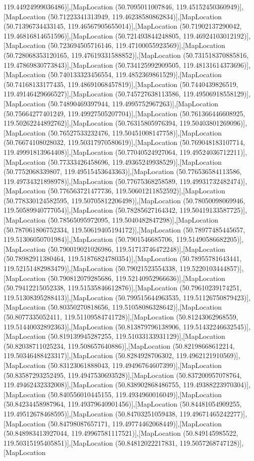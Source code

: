 119.44924999036486)],[MapLocation (50.7095011007846, 119.45152450360949)],[MapLocation (50.71223341313949, 119.46238580862834)],[MapLocation (50.71396734433145, 119.46567905655014)],[MapLocation (50.71902137290042, 119.46816814651596)],[MapLocation (50.721493844248805, 119.46924103012192)],[MapLocation (50.723694505716146, 119.47100055923569)],[MapLocation (50.728068353120165, 119.47619331588852)],[MapLocation (50.731518370885816, 119.47869830773843)],[MapLocation (50.734125992909505, 119.48131614373696)],[MapLocation (50.740133323456554, 119.4852369861529)],[MapLocation (50.74168133177435, 119.48691068457819)],[MapLocation (50.7440439826519, 119.49146429666527)],[MapLocation (50.745727638113586, 119.49506918558129)],[MapLocation (50.74890469397944, 119.4995752967263)],[MapLocation (50.75664277401249, 119.49927505207704)],[MapLocation (50.761366446608925, 119.50262244892762)],[MapLocation (50.76315805976394, 119.50403801269096)],[MapLocation (50.76527533232476, 119.50451008147758)],[MapLocation (50.76674108028032, 119.50317970580619)],[MapLocation (50.769048183107714, 119.49991813964408)],[MapLocation (50.77040524927064, 119.49524036712211)],[MapLocation (50.77333426458696, 119.49365249938529)],[MapLocation (50.7752068339807, 119.49515453643363)],[MapLocation (50.776536584113586, 119.49734321898978)],[MapLocation (50.77675368258589, 119.49931732482474)],[MapLocation (50.776563721477736, 119.50601211852592)],[MapLocation (50.778330124582595, 119.50705812206498)],[MapLocation (50.78050098069946, 119.50589940777054)],[MapLocation (50.78285627164342, 119.50419133587725)],[MapLocation (50.78565095972095, 119.5040482847298)],[MapLocation (50.787061806752334, 119.50619405194172)],[MapLocation (50.78977485445657, 119.51306050701984)],[MapLocation (50.7901546685706, 119.51490586682205)],[MapLocation (50.790019021026986, 119.51713746472248)],[MapLocation (50.78982911380464, 119.51876824780354)],[MapLocation (50.78955781643441, 119.52151482983479)],[MapLocation (50.79021523554338, 119.5220103444857)],[MapLocation (50.790812079285686, 119.52140952966636)],[MapLocation (50.79412215052338, 119.51535846612876)],[MapLocation (50.79610239174251, 119.51308395288413)],[MapLocation (50.799515644963535, 119.51126750879423)],[MapLocation (50.80350270818656, 119.51058086328642)],[MapLocation (50.8077335052411, 119.51109584741728)],[MapLocation (50.81243062968559, 119.51440032892363)],[MapLocation (50.813879796138906, 119.51432246632545)],[MapLocation (50.819139945287255, 119.51033133931129)],[MapLocation (50.82038711025234, 119.508657640886)],[MapLocation (50.82198668612214, 119.50346488423317)],[MapLocation (50.8284928706302, 119.4962121910569)],[MapLocation (50.83123061888043, 119.49496764607399)],[MapLocation (50.83587293252495, 119.4947530693528)],[MapLocation (50.837200957078764, 119.49462432332008)],[MapLocation (50.838902868486755, 119.49388223970304)],[MapLocation (50.840556010445155, 119.4934960016049)],[MapLocation (50.84234458987964, 119.49379640901456)],[MapLocation (50.84481054909255, 119.49512678468595)],[MapLocation (50.84703251059438, 119.49671465242277)],[MapLocation (50.84798087657171, 119.49774462068449)],[MapLocation (50.848983413927044, 119.49967581117521)],[MapLocation (50.849145985522, 119.50315195405851)],[MapLocation (50.84812022217831, 119.5057268747128)],[MapLocation 